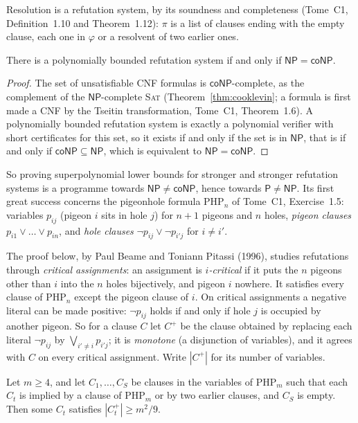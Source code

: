 Resolution is a refutation system, by its soundness and completeness (Tome~C1, Definition~1.10 and Theorem~1.12): $\pi$ is a list of clauses ending with the empty clause, each one in $\varphi$ or a resolvent of two earlier ones.

\begin{proposition}\label{prop:cookreckhow}
There is a polynomially bounded refutation system if and only if $\mathsf{NP}=\mathsf{coNP}$.
\end{proposition}

\begin{proof}
The set of unsatisfiable CNF formulas is $\mathsf{coNP}$-complete, as the complement of the $\mathsf{NP}$-complete \textup{\textsc{Sat}} (Theorem~\ref{thm:cooklevin}; a formula is first made a CNF by the Tseitin transformation, Tome~C1, Theorem~1.6). A polynomially bounded refutation system is exactly a polynomial verifier with short certificates for this set, so it exists if and only if the set is in $\mathsf{NP}$, that is if and only if $\mathsf{coNP}\subseteq\mathsf{NP}$, which is equivalent to $\mathsf{NP}=\mathsf{coNP}$.
\end{proof}

So proving superpolynomial lower bounds for stronger and stronger refutation systems is a programme towards $\mathsf{NP}\ne\mathsf{coNP}$, hence towards $\mathsf P\ne\mathsf{NP}$. Its first great success concerns the pigeonhole formula $\mathrm{PHP}_n$ of Tome~C1, Exercise~1.5: variables $p_{ij}$ (pigeon $i$ sits in hole $j$) for $n+1$ pigeons and $n$ holes, \emph{pigeon clauses} $p_{i1}\lor\dots\lor p_{in}$, and \emph{hole clauses} $\lnot p_{ij}\lor\lnot p_{i'j}$ for $i\ne i'$.

The proof below, by Paul Beame and Toniann Pitassi (1996), studies refutations through \emph{critical assignments}: an assignment is \emph{$i$-critical} if it puts the $n$ pigeons other than $i$ into the $n$ holes bijectively, and pigeon $i$ nowhere. It satisfies every clause of $\mathrm{PHP}_n$ except the pigeon clause of $i$. On critical assignments a negative literal can be made positive: $\lnot p_{ij}$ holds if and only if hole $j$ is occupied by another pigeon. So for a clause $C$ let $C^+$ be the clause obtained by replacing each literal $\lnot p_{ij}$ by $\bigvee_{i'\ne i}p_{i'j}$; it is \emph{monotone} (a disjunction of variables), and it agrees with $C$ on every critical assignment. Write $|C^+|$ for its number of variables.

\begin{lemma}\label{lem:bp}
Let $m\ge4$, and let $C_1,\dots,C_S$ be clauses in the variables of $\mathrm{PHP}_m$ such that each $C_t$ is implied by a clause of $\mathrm{PHP}_m$ or by two earlier clauses, and $C_S$ is empty. Then some $C_t$ satisfies $|C_t^+|\ge m^2/9$.
\end{lemma}

